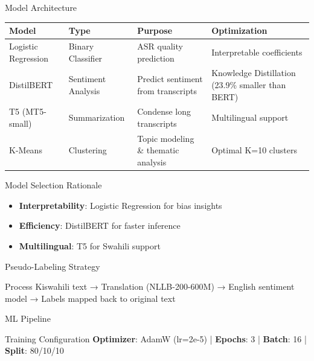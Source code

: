 \documentclass[aspectratio=169,10pt]{beamer}
\begin{document}
\begin{frame}{Model Architecture}
\begin{table}
\centering
\small
\begin{tabular}{@{}llp{4cm}p{4cm}@{}}
\toprule
\textbf{Model} & \textbf{Type} & \textbf{Purpose} & \textbf{Optimization} \\
\midrule
Logistic Regression & Binary Classifier & ASR quality prediction & Interpretable coefficients \\
\midrule
DistilBERT & Sentiment Analysis & Predict sentiment from transcripts & Knowledge Distillation (23.9\% smaller than BERT) \\
\midrule
T5 (MT5-small) & Summarization & Condense long transcripts & Multilingual support \\
\midrule
K-Means & Clustering & Topic modeling \& thematic analysis & Optimal K=10 clusters \\
\bottomrule
\end{tabular}
\end{table}

\vspace{0.3cm}
\begin{block}{Model Selection Rationale}
\begin{itemize}
    \item \textbf{Interpretability}: Logistic Regression for bias insights
    \item \textbf{Efficiency}: DistilBERT for faster inference
    \item \textbf{Multilingual}: T5 for Swahili support
\end{itemize}
\end{block}
\end{frame}

\begin{frame}{Pseudo-Labeling Strategy}
\begin{center}
\scalebox{0.28}{

}
\end{center}

\vspace{-0.3cm}
\begin{block}{Process}
\small
Kiswahili text → Translation (NLLB-200-600M) → English sentiment model → Labels mapped back to original text
\end{block}
\end{frame}

\begin{frame}{ML Pipeline}
\begin{center}
\scalebox{0.55}{

}
\end{center}

\vspace{-0.2cm}
\begin{block}{Training Configuration}
\small
\textbf{Optimizer}: AdamW (lr=2e-5) | \textbf{Epochs}: 3 | \textbf{Batch}: 16 | \textbf{Split}: 80/10/10
\end{block}
\end{frame}
\end{document}

